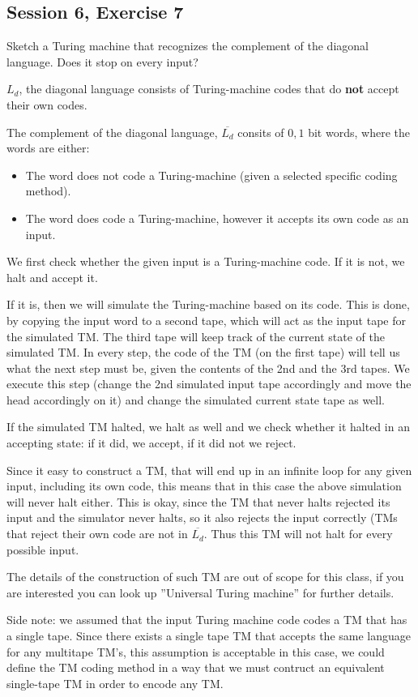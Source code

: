 \subsection {Session 6, Exercise 7}


Sketch a Turing machine that recognizes the complement of the diagonal language. Does it stop on every
input?


$L_d$, the diagonal language consists of Turing-machine codes that do \textbf{not} accept their own codes.

The complement of the diagonal language, $\overline{L_d}$ consits of $0,1$ bit words, where the words are either:
\begin{itemize}
    \item The word does not code a Turing-machine (given a selected specific coding method).
    \item The word does code a Turing-machine, however it accepts its own code as an input.
\end{itemize}

We first check whether the given input is a Turing-machine code. If it is not, we halt and accept it.

If it is, then we will simulate the Turing-machine based on its code. This is done, by copying the input word to a second tape, which will act as the input tape for the simulated TM. The third tape will keep track of the current state of the simulated TM. In every step, the code of the TM (on the first tape) will tell us what the next step must be, given the contents of the 2nd and the 3rd tapes. We execute this step (change the 2nd simulated input tape accordingly and move the head accordingly on it) and change the simulated current state tape as well.

If the simulated TM halted, we halt as well and we check whether it halted in an accepting state: if it did, we accept, if it did not we reject.

Since it easy to construct a TM, that will end up in an infinite loop for any given input, including its own code, this means that in this case the above simulation will never halt either. This is okay, since the TM that never halts rejected its input and the simulator never halts, so it also rejects the input correctly (TMs that reject their own code are not in $\overline{L_d}$. Thus this TM will not halt for every possible input.

The details of the construction of such TM are out of scope for this class, if you are interested you can look up ''Universal Turing machine'' for further details.

Side note: we assumed that the input Turing machine code codes a TM that has a single tape. Since there exists a single tape TM that accepts the same language for any multitape TM's, this assumption is acceptable in this case, we could define the TM coding method in a way that we must contruct an equivalent single-tape TM in order to encode any TM.
